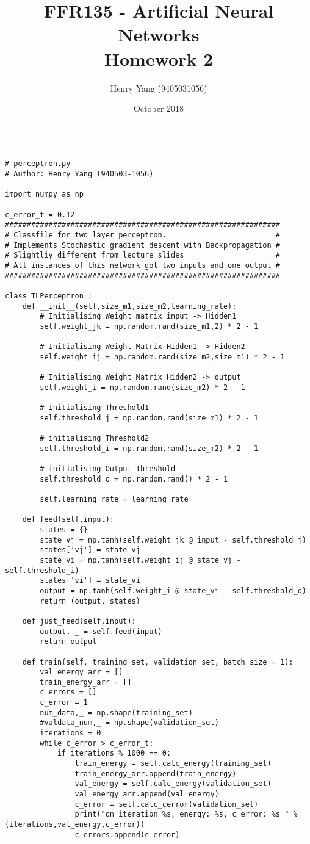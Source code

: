 \documentclass{article}
\author{Henry Yang (9405031056)}
\title{FFR135 - Artificial Neural Networks \\ \large Homework 2}
\date{October 2018}
\begin{document}
\maketitle
    
\begin{verbatim}

# perceptron.py
# Author: Henry Yang (940503-1056)

import numpy as np

c_error_t = 0.12
###############################################################
# Classfile for two layer perceptron.                         #
# Implements Stochastic gradient descent with Backpropagation #
# Slightliy different from lecture slides                     # 
# All instances of this network got two inputs and one output #
############################################################### 

class TLPerceptron :
    def __init__(self,size_m1,size_m2,learning_rate):
        # Initialising Weight matrix input -> Hidden1
        self.weight_jk = np.random.rand(size_m1,2) * 2 - 1

        # Initialising Weight Matrix Hidden1 -> Hidden2
        self.weight_ij = np.random.rand(size_m2,size_m1) * 2 - 1

        # Initialising Weight Matrix Hidden2 -> output
        self.weight_i = np.random.rand(size_m2) * 2 - 1

        # Initialising Threshold1
        self.threshold_j = np.random.rand(size_m1) * 2 - 1
        
        # initialising Threshold2
        self.threshold_i = np.random.rand(size_m2) * 2 - 1

        # initialising Output Threshold
        self.threshold_o = np.random.rand() * 2 - 1

        self.learning_rate = learning_rate

    def feed(self,input):
        states = {}
        state_vj = np.tanh(self.weight_jk @ input - self.threshold_j)
        states['vj'] = state_vj
        state_vi = np.tanh(self.weight_ij @ state_vj - self.threshold_i)
        states['vi'] = state_vi
        output = np.tanh(self.weight_i @ state_vi - self.threshold_o)
        return (output, states)
    
    def just_feed(self,input):
        output, _ = self.feed(input)
        return output

    def train(self, training_set, validation_set, batch_size = 1):
        val_energy_arr = []
        train_energy_arr = []
        c_errors = []
        c_error = 1
        num_data,_ = np.shape(training_set)
        #valdata_num,_ = np.shape(validation_set)
        iterations = 0
        while c_error > c_error_t:
            if iterations % 1000 == 0:
                train_energy = self.calc_energy(training_set)
                train_energy_arr.append(train_energy)
                val_energy = self.calc_energy(validation_set)
                val_energy_arr.append(val_energy)
                c_error = self.calc_cerror(validation_set)
                print("on iteration %s, energy: %s, c_error: %s " % (iterations,val_energy,c_error))
                c_errors.append(c_error)
            

\end{verbatim}
\end{document}
